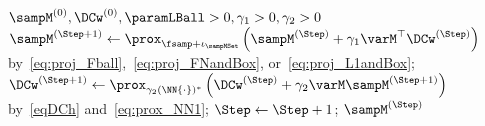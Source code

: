 \begin{algorithm}[t]
    \caption{Sampling operator design algorithm}
    \label{algo:GDPG}
    \begin{algorithmic}[1]
    \renewcommand{\algorithmicrequire}{\textbf{Input:}}
    \renewcommand{\algorithmicensure}{\textbf{Output:}}
    \REQUIRE $ \sampM^{(0)}, \DCw^{(0)}, \paramLBall>0, \gamma_1>0, \gamma_2>0$
    \STATE $ \sampM^{(\Step+1)} \leftarrow \prox_{\fsamp + \iota_{\sampMSet}}\left( \sampM^{(\Step)} + \gamma_{1} \varM^\top \DCw^{(\Step)}\right)$
    \\by~\eqref{eq:proj_Fball},~\eqref{eq:proj_FNandBox}, or~\eqref{eq:proj_L1andBox}; \label{al_s}
    \STATE $ \DCw^{(\Step+1)} \leftarrow \prox_{\gamma_{2} (\NN{\cdot})^{*}} \left(\DCw^{(\Step)} + \gamma_{2}\varM \sampM^{(\Step + 1)}\right)$
    \\by~\eqref{eqDCh} and~\eqref{eq:prox_NN1}; \label{al_z}
    \STATE $ \Step \leftarrow \Step+1 $;
    \ENDWHILE
    \ENSURE $\sampM^{(\Step)}$
    \end{algorithmic}
\end{algorithm}